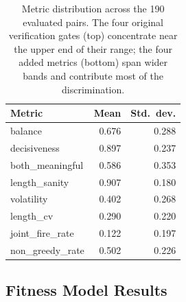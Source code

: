 \documentclass[conference]{IEEEtran}
\begin{document}
  \begin{table}[ht!]                                                          
  \centering
  \caption{Metric distribution across the 190 evaluated pairs. The four original
   verification gates (top) concentrate near the upper end of their range; the
  four added metrics (bottom) span wider bands and contribute most of the
  discrimination.}                                 
  \label{tab:metric_distribution}              
  \begin{tabular}{|l|r|r|}              
  \hline                       
  \textbf{Metric} & \textbf{Mean} & \textbf{Std.\ dev.} \\           
  \hline                                           
  balance         & 0.676 & 0.288 \\                                            
  \hline                                
  decisiveness    & 0.897 & 0.237 \\                                            
  \hline                                                                      
  both\_meaningful & 0.586 & 0.353 \\          
  \hline                                                                        
  length\_sanity  & 0.907 & 0.180 \\
  \hline                                                                        
  \hline                                                                      
  volatility      & 0.402 & 0.268 \\                                            
  \hline                                       
  length\_cv      & 0.290 & 0.220 \\                                            
  \hline                                                                      
  joint\_fire\_rate & 0.122 & 0.197 \\                               
  \hline                                           
  non\_greedy\_rate & 0.502 & 0.226 \\                                          
  \hline                                
  \end{tabular}   
  \end{table}       


\subsection{Fitness Model Results}           
                                                                                
\end{document}
